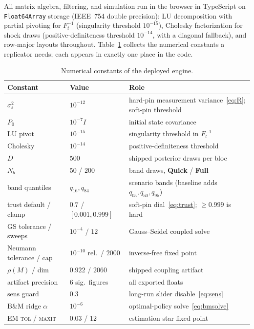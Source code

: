 \documentclass[11pt]{article}
\newcommand{\ui}[1]{\textbf{#1}}
\theoremstyle{plain}
\theoremstyle{remark}
\begin{document}
All matrix algebra, filtering, and simulation run in the browser in
TypeScript on \texttt{Float64Array} storage (IEEE~754 double precision):
LU decomposition with partial pivoting for $F_t^{-1}$ (singularity
threshold $10^{-15}$), Cholesky factorization for shock draws
(positive-definiteness threshold $10^{-14}$, with a diagonal fallback),
and row-major layouts throughout. Table~\ref{tab:constants} collects the
numerical constants a replicator needs; each appears in exactly one
place in the code.

\begin{table}[H]
\centering
\caption{Numerical constants of the deployed engine.}
\label{tab:constants}
\begin{small}
\begin{tabular}{@{}lll@{}}
\toprule
Constant & Value & Role \\
\midrule
$\sigma^2_\varepsilon$ & $10^{-12}$ & hard-pin measurement variance~\eqref{eq:R}; soft-pin threshold \\
$P_0$ & $10^{-7} I$ & initial state covariance \\
LU pivot & $10^{-15}$ & singularity threshold in $F_t^{-1}$ \\
Cholesky & $10^{-14}$ & positive-definiteness threshold \\
$D$ & $500$ & shipped posterior draws per bloc \\
$N_b$ & $50$ / $200$ & band draws, \ui{Quick} / \ui{Full} \\
band quantiles & $q_{16}, q_{84}$ & scenario bands (baseline adds $q_{05}, q_{50}, q_{95}$) \\
trust default / clamp & $0.7$ / $[0.001, 0.999]$ & soft-pin dial~\eqref{eq:trust}; $\ge 0.999$ is hard \\
GS tolerance / sweeps & $10^{-4}$ / $12$ & Gauss--Seidel coupled solve \\
Neumann tolerance / cap & $10^{-10}$ rel.\ / $2000$ & inverse-free fixed point \\
$\rho(M)$ / dim & $0.922$ / $2060$ & shipped coupling artifact \\
artifact precision & 6 sig.\ figures & all exported floats \\
$\mathrm{sens}$ guard & $0.3$ & long-run slider disable~\eqref{eq:sens} \\
B\&M ridge $\alpha$ & $10^{-6}$ & optimal-policy solve~\eqref{eq:bmsolve} \\
EM \textsc{tol} / \textsc{maxit} & $0.03$ / $12$ & estimation star fixed point \\
\bottomrule
\end{tabular}
\end{small}
\end{table}
\end{document}
